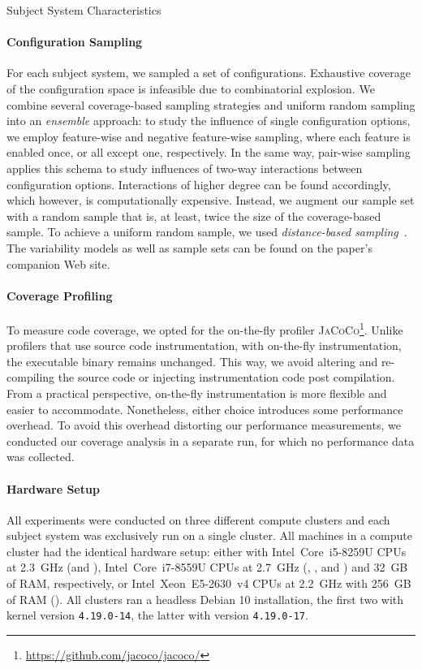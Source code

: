{	\begin{table}[ht!]
		\centering
		\caption{Subject System Characteristics}
		
		\label{tab:subject_systems}
	\end{table}

	\paragraph*{Configuration Sampling}\label{sec:sampling}
	For each subject system, we sampled a set of configurations. Exhaustive coverage of the configuration space is infeasible due to combinatorial explosion. We combine several coverage-based sampling strategies and uniform random sampling into an \emph{ensemble} approach: to study the influence of single configuration options, we employ feature-wise and negative feature-wise sampling, where each feature is enabled once, or all except one, respectively. In the same way, pair-wise sampling applies this schema to study influences of two-way interactions between configuration options. Interactions of higher degree can be found accordingly, which however, is computationally expensive. Instead, we augment our sample set with a random sample that is, at least, twice the size of the coverage-based sample. To achieve a uniform random sample, we used \emph{distance-based sampling}~\cite{kaltenecker_distance-based_2019}. The variability models as well as sample sets can be found on the paper's companion Web site.
	
	\paragraph*{Coverage Profiling}\label{sec:profiling}
	To measure code coverage, we opted for the on-the-fly profiler \textsc{JaCoCo}\footnote{\url{https://github.com/jacoco/jacoco/}}. Unlike profilers that use source code instrumentation, with on-the-fly instrumentation, the executable binary remains unchanged. This way, we avoid altering and re-compiling the source code or injecting instrumentation code post compilation. From a practical perspective, on-the-fly instrumentation is more flexible and easier to accommodate. Nonetheless, either choice introduces some performance overhead. To avoid this overhead distorting our performance measurements, we conducted our coverage analysis in a separate run, for which no performance data was collected. 	
	
	\paragraph*{Hardware Setup}
	All experiments were conducted on three different compute clusters and each subject system was exclusively run on a single cluster. All machines in a compute cluster had the identical hardware setup: either with Intel~Core~i5-8259U CPUs at 2.3~GHz (\jumper and \kanzi),  Intel~Core~i7-8559U CPUs at 2.7~GHz (\dconvert, \batik, and \jadx) and 32~GB of RAM, respectively, or Intel~Xeon~E5-2630~v4 CPUs at 2.2~GHz with 256~GB of RAM (\htwo). All clusters ran a headless Debian 10 installation, the first two with kernel version \mbox{\texttt{4.19.0-14}}, the latter with version \mbox{\texttt{4.19.0-17}}. 
	
}
